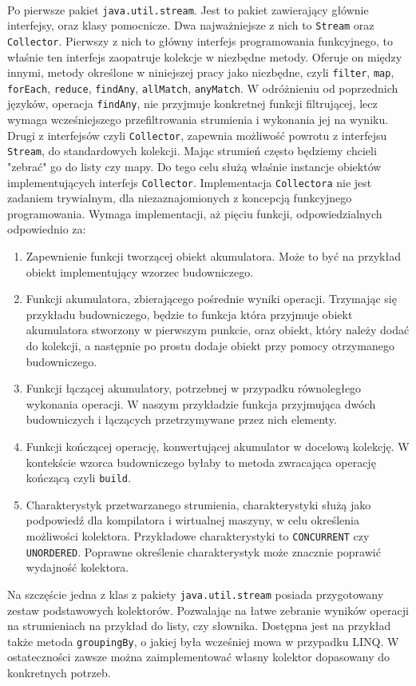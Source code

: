 \documentclass[a4paper,10pt]{report}
\begin{document}
\paragraph{}
 Po pierwsze pakiet \verb|java.util.stream|. Jest to pakiet zawierający głównie interfejsy, oraz klasy pomocnicze. Dwa najważniejsze z nich to \verb|Stream| oraz \verb|Collector|. Pierwszy z nich to główny interfejs programowania funkcyjnego, to właśnie ten interfejs zaopatruje kolekcje w niezbędne metody. Oferuje on między innymi, metody określone w niniejszej pracy jako niezbędne, czyli \verb|filter|, \verb|map|, \verb|forEach|, \verb|reduce|, \verb|findAny|, \verb|allMatch|, \verb|anyMatch|. W odróżnieniu od poprzednich języków, operacja \verb|findAny|, nie przyjmuje konkretnej funkcji filtrującej, lecz wymaga wcześniejszego przefiltrowania strumienia i wykonania jej na wyniku. Drugi z interfejsów czyli \verb|Collector|, zapewnia możliwość powrotu z interfejsu \verb|Stream|, do standardowych kolekcji. Mając strumień często będziemy chcieli "zebrać" go do listy czy mapy. Do tego celu służą właśnie instancje obiektów implementujących interfejs \verb|Collector|. Implementacja \verb|Collectora| nie jest zadaniem trywialnym, dla niezaznajomionych z koncepcją funkcyjnego programowania. Wymaga implementacji, aż pięciu funkcji, odpowiedzialnych odpowiednio za:
\begin{enumerate}
\item Zapewnienie funkcji tworzącej obiekt akumulatora. Może to być na przykład obiekt implementujący wzorzec budowniczego.
\item Funkcji akumulatora, zbierającego pośrednie wyniki operacji. Trzymając się przykładu budowniczego, będzie to funkcja która przyjmuje obiekt akumulatora stworzony w pierwszym punkcie, oraz obiekt, który należy dodać do kolekcji, a następnie po prostu dodaje obiekt przy pomocy otrzymanego budowniczego.
\item Funkcji łączącej akumulatory, potrzebnej w przypadku równoległego wykonania operacji. W naszym przykładzie funkcja przyjmująca dwóch budowniczych i łączących przetrzymywane przez nich elementy.
\item Funkcji kończącej operację, konwertującej akumulator w docelową kolekcję. W kontekście wzorca budowniczego byłaby to metoda zwracająca operację kończącą czyli \verb|build|.
\item Charakterystyk przetwarzanego strumienia, charakterystyki służą jako podpowiedź dla kompilatora i wirtualnej maszyny, w celu określenia możliwości kolektora. Przykładowe charakterystyki to \verb|CONCURRENT| czy \verb|UNORDERED|. Poprawne określenie charakterystyk może znacznie poprawić wydajność kolektora.
\end{enumerate}
Na szczęście jedna z klas z pakiety \verb|java.util.stream| posiada przygotowany zestaw podstawowych kolektorów. Pozwalając na łatwe zebranie wyników operacji na strumieniach na przykład do listy, czy słownika. Dostępna jest na przykład także metoda \verb|groupingBy|, o jakiej była wcześniej mowa w przypadku LINQ. W ostateczności zawsze można zaimplementować własny kolektor dopasowany do konkretnych potrzeb.
\end{document}
